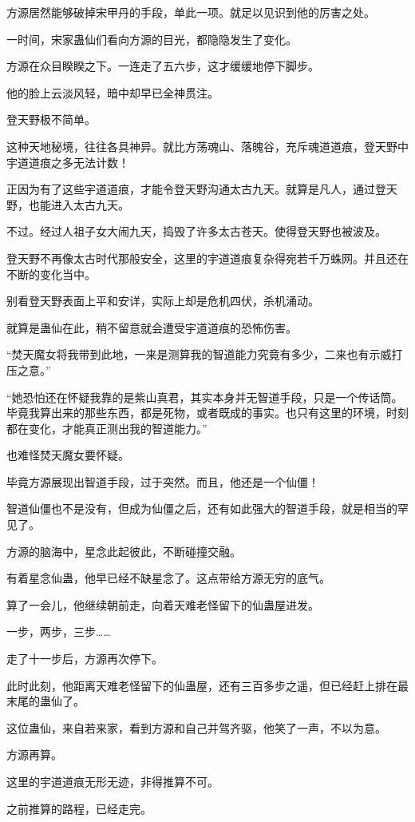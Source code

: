 \begin{this_body}
方源居然能够破掉宋甲丹的手段，单此一项。就足以见识到他的厉害之处。

一时间，宋家蛊仙们看向方源的目光，都隐隐发生了变化。

方源在众目睽睽之下。一连走了五六步，这才缓缓地停下脚步。

他的脸上云淡风轻，暗中却早已全神贯注。

登天野极不简单。

这种天地秘境，往往各具神异。就比方荡魂山、落魄谷，充斥魂道道痕，登天野中宇道道痕之多无法计数！

正因为有了这些宇道道痕，才能令登天野沟通太古九天。就算是凡人，通过登天野，也能进入太古九天。

不过。经过人祖子女大闹九天，捣毁了许多太古苍天。使得登天野也被波及。

登天野不再像太古时代那般安全，这里的宇道道痕复杂得宛若千万蛛网。并且还在不断的变化当中。

别看登天野表面上平和安详，实际上却是危机四伏，杀机涌动。

就算是蛊仙在此，稍不留意就会遭受宇道道痕的恐怖伤害。

“焚天魔女将我带到此地，一来是测算我的智道能力究竟有多少，二来也有示威打压之意。”

“她恐怕还在怀疑我靠的是紫山真君，其实本身并无智道手段，只是一个传话筒。毕竟我算出来的那些东西，都是死物，或者既成的事实。也只有这里的环境，时刻都在变化，才能真正测出我的智道能力。”

也难怪焚天魔女要怀疑。

毕竟方源展现出智道手段，过于突然。而且，他还是一个仙僵！

智道仙僵也不是没有，但成为仙僵之后，还有如此强大的智道手段，就是相当的罕见了。

方源的脑海中，星念此起彼此，不断碰撞交融。

有着星念仙蛊，他早已经不缺星念了。这点带给方源无穷的底气。

算了一会儿，他继续朝前走，向着天难老怪留下的仙蛊屋进发。

一步，两步，三步……

走了十一步后，方源再次停下。

此时此刻，他距离天难老怪留下的仙蛊屋，还有三百多步之遥，但已经赶上排在最末尾的蛊仙了。

这位蛊仙，来自若来家，看到方源和自己并驾齐驱，他笑了一声，不以为意。

方源再算。

这里的宇道道痕无形无迹，非得推算不可。

之前推算的路程，已经走完。


\end{this_body}
